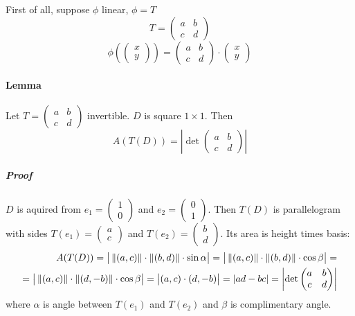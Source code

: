 First of all, suppose $\phi$ linear, $\phi=T$
$$T = \begin{pmatrix}
a&b\\c&d
\end{pmatrix}$$
$$\phi\left(\begin{pmatrix}
x\\y
\end{pmatrix}\right) = \begin{pmatrix}
a&b\\c&d
\end{pmatrix} \cdot \begin{pmatrix}
x\\y
\end{pmatrix}$$
\paragraph{Lemma}
Let $T = \begin{pmatrix}
a&b\\c&d
\end{pmatrix}$ invertible.
$D$ is square $1\times 1$. Then $$A(T(D)) = \left| \det \begin{pmatrix}
a&b\\c&d
\end{pmatrix} \right|$$
\subparagraph{Proof}
$D$ is aquired from $e_1= \begin{pmatrix}1\\0\end{pmatrix}$ and $e_2= \begin{pmatrix}0\\1\end{pmatrix}$. Then $T(D)$ is parallelogram with sides $T(e_1)= \begin{pmatrix}a\\c\end{pmatrix}$ and $T(e_2) = \begin{pmatrix}b\\d\end{pmatrix}$. Its area is height times basis:
\begin{align*}
A(T(D)) = \big|\left\lVert(a,c)\right\rVert \cdot \left\lVert(b,d)\right\rVert \cdot \sin \alpha\big| = \big|\left\lVert(a,c)\right\rVert \cdot \left\lVert(b,d)\right\rVert \cdot \cos \beta\big| =\\= \big|\left\lVert(a,c)\right\rVert \cdot \left\lVert(d,-b)\right\rVert \cdot \cos \beta\big| = \big|(a,c) \cdot (d,-b)\big| = |ad-bc| = \left| \det \begin{pmatrix}
a&b\\c&d
\end{pmatrix} \right|
\end{align*}
where $\alpha$ is angle between $T(e_1)$ and $T(e_2)$ and $\beta$ is complimentary angle.
